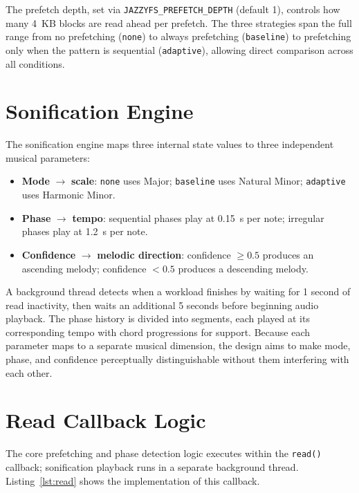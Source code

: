 \documentclass[12pt]{report}
\begin{document}
The prefetch depth, set via \texttt{JAZZYFS\_PREFETCH\_DEPTH} (default 1),
controls how many 4~KB blocks are read ahead per prefetch. The three
strategies span the full range from no prefetching (\texttt{none}) to
always prefetching (\texttt{baseline}) to prefetching only when the pattern
is sequential (\texttt{adaptive}), allowing direct comparison across all
conditions.

\section{Sonification Engine}
\label{sec:design-sonification}

The sonification engine maps three internal state values to three
independent musical parameters:

\begin{itemize}
    \item \textbf{Mode} $\rightarrow$ \textbf{scale}: \texttt{none} uses
    Major; \texttt{baseline} uses Natural Minor; \texttt{adaptive} uses
    Harmonic Minor.
    \item \textbf{Phase} $\rightarrow$ \textbf{tempo}: sequential phases
    play at 0.15~s per note; irregular phases play at 1.2~s per note.
    \item \textbf{Confidence} $\rightarrow$ \textbf{melodic direction}:
    confidence $\geq 0.5$ produces an ascending melody; confidence $< 0.5$
    produces a descending melody.
\end{itemize}

A background thread detects when a workload finishes by waiting for 1
second of read inactivity, then waits an additional 5 seconds before
beginning audio playback. The phase history
is divided into segments, each played at its corresponding tempo with chord
progressions for support. Because each parameter maps to a separate musical
dimension, the design aims to make mode, phase, and confidence
perceptually distinguishable without them interfering with each other.

\section{Read Callback Logic}
\label{sec:design-read}

The core prefetching and phase detection logic executes within the \texttt{read()} callback; sonification playback runs in a separate background thread.
Listing~\ref{lst:read} shows the implementation of this callback.
\end{document}
